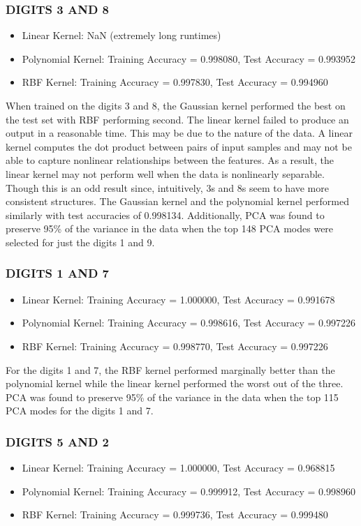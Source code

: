 \documentclass[12pt]{article}
\begin{document}
\subsubsection*{DIGITS 3 AND 8}

\begin{itemize}
    \item Linear Kernel: NaN (extremely long runtimes)
    \item Polynomial Kernel: Training Accuracy = 0.998080, Test Accuracy = 0.993952
    \item RBF Kernel: Training Accuracy = 0.997830, Test Accuracy = 0.994960
\end{itemize}

When trained on the digits 3 and 8, the Gaussian kernel performed the best on the test set with RBF performing second.
The linear kernel failed to produce an output in a reasonable time. This may be due to the nature of the data. A linear 
kernel computes the dot product between pairs of input samples and may not be able to capture nonlinear relationships 
between the features. As a result, the linear kernel may not perform well when the data is nonlinearly separable. 
Though this is an odd result since, intuitively, 3s and 8s seem to have more consistent structures. The Gaussian 
kernel and the polynomial kernel performed similarly with test accuracies of 0.998134. Additionally,
PCA was found to preserve 95\% of the variance in the data when the top 148 PCA modes were selected for just the digits 1 and 9.


\subsubsection*{DIGITS 1 AND 7}
\begin{itemize}
    \item Linear Kernel: Training Accuracy = 1.000000, Test Accuracy = 0.991678
    \item Polynomial Kernel: Training Accuracy = 0.998616, Test Accuracy = 0.997226
    \item RBF Kernel: Training Accuracy = 0.998770, Test Accuracy = 0.997226
\end{itemize}

For the digits 1 and 7, the RBF kernel performed marginally better than the polynomial kernel while the linear kernel 
performed the worst out of the three. PCA was found to preserve 95\% of the variance in the data when the top 115 PCA modes
for the digits 1 and 7.

\subsubsection*{DIGITS 5 AND 2}
\begin{itemize}
    \item Linear Kernel: Training Accuracy = 1.000000, Test Accuracy = 0.968815
    \item Polynomial Kernel: Training Accuracy = 0.999912, Test Accuracy = 0.998960
    \item RBF Kernel: Training Accuracy = 0.999736, Test Accuracy = 0.999480
\end{itemize}
\end{document}
